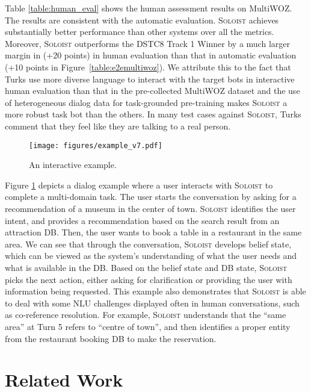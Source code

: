 \documentclass[11pt,a4paper]{article}
\newcommand{\model}{\textsc{Soloist}}
\begin{document}
Table \ref{table:human_eval} shows the human assessment results on MultiWOZ. The results are consistent with the automatic evaluation. \model{} achieves substantially better performance than other systems over all the metrics. Moreover, \model{} outperforms the DSTC8 Track 1 Winner by a much larger margin in  (+20 points) in human evaluation than that in automatic evaluation (+10 points in Figure~\ref{table:e2emultiwoz}).
We attribute this to the fact that Turks use more diverse language to interact with the target bots in interactive human evaluation than that in the pre-collected MultiWOZ dataset and the use of heterogeneous dialog data for task-grounded pre-training makes \model{} a more robust task bot than the others. 
In many test cases against \model{}, Turks comment that they feel like they are talking to a real person.

\begin{figure}[!htbp]
\centering
\texttt{[image: figures/example\_v7.pdf]}
\caption{An interactive example.}
\label{fig:example}
\end{figure} 

Figure \ref{fig:example} depicts a dialog example where a user interacts with \model{} to complete a multi-domain task.
The user starts the conversation by asking for a recommendation of a museum in the center of town. \model{} identifies the user intent, and provides a recommendation based on the search result from an attraction DB. Then, the user wants to book a table in a restaurant in the same area. 
We can see that through the conversation, \model{} develops belief state, which can be viewed as the system’s understanding of what the user needs and what is available in the DB. Based on the belief state and DB state, \model{} picks the next action, either asking for clarification or providing the user with information being requested. 
This example also demonstrates that \model{} is able to deal with some NLU challenges displayed often in human conversations, such as co-reference resolution. For example, \model{} understands that the ``same area'' at Turn 5 refers to ``centre of town'', and then identifies a proper entity from the restaurant booking DB to make the reservation.







\section{Related Work}
\end{document}

